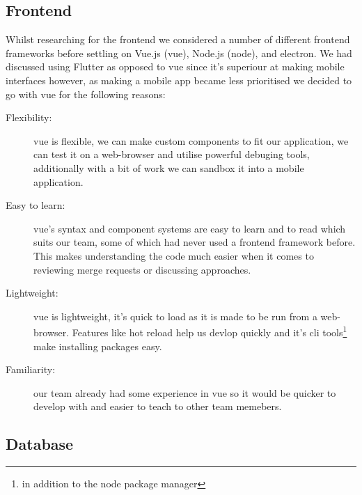 \documentclass{article}
\begin{document}
    \subsection{Frontend}
    Whilst researching for the frontend we considered a number of different frontend frameworks before settling on Vue.js (vue), Node.js (node), and electron. We had discussed using Flutter as opposed to vue since it's superiour at making mobile interfaces however, as making a mobile app became less prioritised we decided to go with vue for the following reasons: 
    \begin{description}
      \item[Flexibility:] vue is flexible, we can make custom components to fit our application, we can test it on a web-browser and utilise powerful debuging tools, additionally with a bit of work we can sandbox it into a mobile application.
      \item[Easy to learn:] vue's syntax and component systems are easy to learn and to read which suits our team, some of which had never used a frontend framework before. This makes understanding the code much easier when it comes to reviewing merge requests or discussing approaches.
      \item[Lightweight:] vue is lightweight, it's quick to load as it is made to be run from a web-browser. Features like hot reload help us devlop quickly and it's cli tools\footnote{in addition to the node package manager} make installing packages easy.
      \item[Familiarity:] our team already had some experience in vue so it would be quicker to develop with and easier to teach to other team memebers.
    \end{description}


 
    \subsection{Database}
\end{document}
